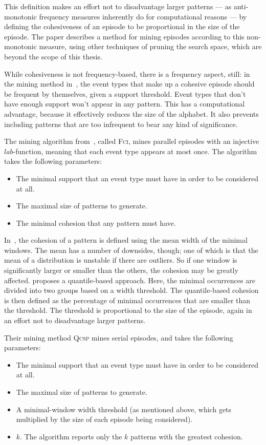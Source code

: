This definition makes an effort not to disadvantage larger patterns --- as anti-monotonic frequency measures inherently do for computational reasons --- by defining the cohesiveness of an episode to be proportional in the size of the episode. The paper describes a method for mining episodes according to this non-monotonic measure, using other techniques of pruning the search space, which are beyond the scope of this thesis.

While cohesiveness is not frequency-based, there is a frequency aspect, still: in the mining method in~\cite{cule2016efficient}, the event types that make up a cohesive episode should be frequent by themselves, given a support threshold. Event types that don't have enough support won't appear in any pattern. This has a computational advantage, because it effectively reduces the size of the alphabet. It also prevents including patterns that are too infrequent to bear any kind of significance.

The mining algorithm from~\cite{cule2016efficient}, called \textsc{Fci}, mines parallel episodes with an injective $ lab $-function, meaning that each event type appears at most once. The algorithm takes the following parameters:
\begin{itemize}
\item The minimal support that an event type must have in order to be considered at all.
\item The maximal size of patterns to generate.
\item The minimal cohesion that any pattern must have.
\end{itemize}

In~\cite{cule2016efficient}, the cohesion of a pattern is defined using the mean width of the minimal windows. The mean has a number of downsides, though; one of which is that the mean of a distribution is unstable if there are outliers. So if one window is significantly larger or smaller than the others, the cohesion may be greatly affected. \citep{feremans2018mining} proposes a quantile-based approach. Here, the minimal occurrences are divided into two groups based on a width threshold. The quantile-based cohesion is then defined as the percentage of minimal occurrences that are smaller than the threshold. The threshold is proportional to the size of the episode, again in an effort not to disadvantage larger patterns.

Their mining method \textsc{Qcsp} mines serial episodes, and takes the following parameters:
\begin{itemize}
\item The minimal support that an event type must have in order to be considered at all.
\item The maximal size of patterns to generate.
\item A minimal-window width threshold (as mentioned above, which gets multiplied by the size of each episode being considered).
\item $ k $. The algorithm reports only the $ k $ patterns with the greatest cohesion.
\end{itemize}

